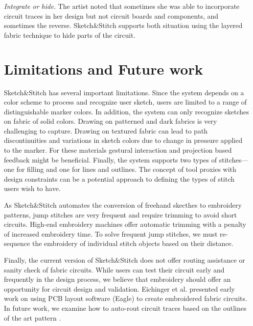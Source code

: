 \documentclass[header.tex]{subfiles}
\begin{document}
\textit{Integrate or hide.} The artist noted that sometimes she was able to incorporate circuit traces in her design but not circuit boards and components, and sometimes the reverse. Sketch\&Stitch supports both situation using the layered fabric technique to hide parts of the circuit.


\section{Limitations and Future work}

Sketch\&Stitch has several important limitations. Since the system depends on a color scheme to process and recognize user sketch, users are limited to a range of distinguishable marker colors. 
In addition, the system can only recognize sketches on fabric of solid colors. Drawing on patterned and dark fabrics is very challenging to capture.  
Drawing on textured fabric can lead to path discontinuities and variations in sketch colors due to change in pressure applied to the marker. For these materials gestural interaction \cite{} and projection based feedback \cite{} might be beneficial. Finally, the system supports two types of stitches---one for filling and one for lines and outlines. The concept of tool proxies with design constraints \cite{mueller2012interactive} can be a potential approach to defining the types of stitch users wish to have.


As Sketch\&Stitch automates the conversion of freehand skecthes to embroidery patterns, jump stitches are very frequent and require trimming to avoid short circuits. High-end embroidery machines offer automatic trimming with a penalty of increased embroidery time. To solve frequent jump stitches, we must re-sequence the embroidery of individual stitch objects based on their distance. 

Finally, the current version of Sketch\&Stitch does not offer routing assistance or sanity check of fabric circuits. While users can test their circuit early and frequently in the design process, we believe that embroidery should offer an opportunity for circuit design and validation. Eichinger et al. \cite{eichinger2007using} presented early work on using PCB layout software (Eagle) to create embroidered fabric circuits. 
In future work, we examine how to auto-rout circuit traces based on the outlines of the art pattern \cite{savage2014series}.
\end{document}
